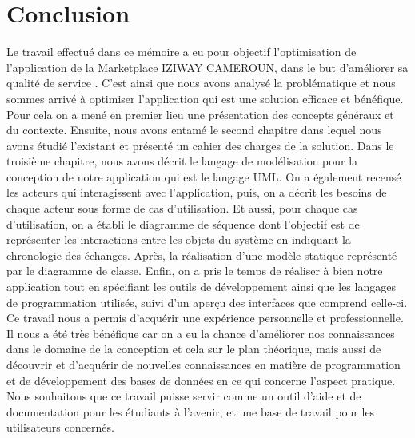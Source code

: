 \chapter*{Conclusion}         %
\thispagestyle{fancy}
\vspace{-2cm}
Le travail effectué dans ce mémoire a eu pour objectif l’optimisation de l’application de la Marketplace IZIWAY CAMEROUN, dans le but d’améliorer sa qualité de service . C’est ainsi que nous avons analysé la problématique et nous sommes arrivé à optimiser l’application qui est une solution efficace et bénéfique. Pour cela on a mené en premier lieu une présentation des concepts généraux et du contexte. Ensuite, nous avons entamé le second chapitre dans lequel nous avons étudié l’existant et présenté un cahier des charges de la solution. Dans le troisième chapitre, nous avons décrit le langage de modélisation pour la conception de notre application qui est le langage UML. On a également recensé les acteurs qui interagissent avec l’application, puis, on a décrit les besoins de chaque acteur sous forme de cas d’utilisation. Et aussi, pour chaque cas d’utilisation, on a établi le diagramme de séquence dont l’objectif est de représenter les interactions entre les objets du système en indiquant la chronologie des échanges. Après, la réalisation d’une modèle statique représenté par le diagramme de classe. Enfin, on a pris le temps de réaliser à bien notre application tout en spécifiant les outils de développement ainsi que les langages de programmation utilisés, suivi d’un aperçu des interfaces que comprend celle-ci. Ce travail nous a permis d’acquérir une expérience personnelle et professionnelle. Il nous a été très bénéfique car on a eu la chance d’améliorer nos connaissances dans le domaine de la conception et cela sur le plan théorique, mais aussi de découvrir et d’acquérir de nouvelles connaissances en matière de programmation et de développement des bases de données en ce qui concerne l’aspect pratique. Nous souhaitons que ce travail puisse servir comme un outil d’aide et de documentation pour les étudiants à l’avenir, et une base de travail pour les utilisateurs concernés.